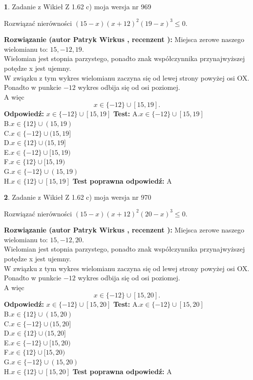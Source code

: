 \documentclass[12pt, a4paper]{article}
\theoremstyle{definition} %
\newtheorem{zad}{}
\newcommand{\zadStart}[1]{\begin{zad}#1\newline}
\newcommand{\zadStop}{\end{zad}}
\newcommand{\rozwStart}[2]{\noindent \textbf{Rozwiązanie (autor #1 , recenzent #2): }\newline}
\newcommand{\rozwStop}{\newline}
\newcommand{\odpStart}{\noindent \textbf{Odpowiedź:}\newline}
\newcommand{\odpStop}{\newline}
\newcommand{\testStart}{\noindent \textbf{Test:}\newline}
\newcommand{\testStop}{\newline}
\newcommand{\kluczStart}{\noindent \textbf{Test poprawna odpowiedź:}\newline}
\newcommand{\kluczStop}{\newline}
\begin{document}
\zadStart{Zadanie z Wikieł Z 1.62 c) moja wersja nr 969}

Rozwiązać nierówności $(15-x)(x+12)^{2}(19-x)^{3}\le0$.
\zadStop
\rozwStart{Patryk Wirkus}{}
Miejsca zerowe naszego wielomianu to: $15, -12, 19$.\\
Wielomian jest stopnia parzystego, ponadto znak współczynnika przy\linebreak najwyższej potędze x jest ujemny.\\ W związku z tym wykres wielomianu zaczyna się od lewej strony powyżej osi OX.\\
Ponadto w punkcie $-12$ wykres odbija się od osi poziomej.\\
A więc $$x \in \{-12\} \cup [15,19].$$
\rozwStop
\odpStart
$x \in \{-12\} \cup [15,19]$
\odpStop
\testStart
A.$x \in \{-12\} \cup [15,19]$\\
B.$x \in \{12\} \cup (15,19)$\\
C.$x \in \{-12\} \cup (15,19]$\\
D.$x \in \{12\} \cup (15,19]$\\
E.$x \in \{-12\} \cup [15,19)$\\
F.$x \in \{12\} \cup [15,19)$\\
G.$x \in \{-12\} \cup (15,19)$\\
H.$x \in \{12\} \cup [15,19]$
\testStop
\kluczStart
A
\kluczStop



\zadStart{Zadanie z Wikieł Z 1.62 c) moja wersja nr 970}

Rozwiązać nierówności $(15-x)(x+12)^{2}(20-x)^{3}\le0$.
\zadStop
\rozwStart{Patryk Wirkus}{}
Miejsca zerowe naszego wielomianu to: $15, -12, 20$.\\
Wielomian jest stopnia parzystego, ponadto znak współczynnika przy\linebreak najwyższej potędze x jest ujemny.\\ W związku z tym wykres wielomianu zaczyna się od lewej strony powyżej osi OX.\\
Ponadto w punkcie $-12$ wykres odbija się od osi poziomej.\\
A więc $$x \in \{-12\} \cup [15,20].$$
\rozwStop
\odpStart
$x \in \{-12\} \cup [15,20]$
\odpStop
\testStart
A.$x \in \{-12\} \cup [15,20]$\\
B.$x \in \{12\} \cup (15,20)$\\
C.$x \in \{-12\} \cup (15,20]$\\
D.$x \in \{12\} \cup (15,20]$\\
E.$x \in \{-12\} \cup [15,20)$\\
F.$x \in \{12\} \cup [15,20)$\\
G.$x \in \{-12\} \cup (15,20)$\\
H.$x \in \{12\} \cup [15,20]$
\testStop
\kluczStart
A
\kluczStop
\end{document}
